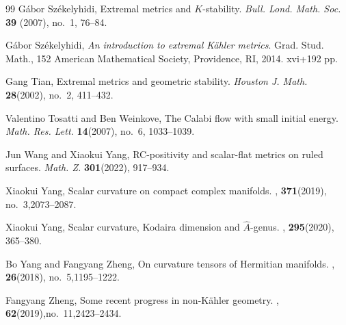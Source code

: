 \documentclass[12pt]{amsart}
\theoremstyle{plain}
\theoremstyle{definition}
\renewcommand{\hat}{\widehat}
\renewcommand{\>}{\rightarrow}
\renewcommand{\#}{\sharp}
\numberwithin{equation}{section} %
\begin{document}
\begin{thebibliography}{99}
    G\'abor  Sz\'ekelyhidi, Extremal metrics and $K$-stability.
    \emph{Bull. Lond. Math. Soc.}
    {\bf 39} (2007), no.~1, 76--84.

    G\'abor  Sz\'ekelyhidi,
    {\it An introduction to extremal K\"ahler metrics}.
     Grad. Stud. Math., 152 American Mathematical Society, Providence, RI, 2014. xvi+192 pp.

    Gang Tian,
    Extremal metrics and geometric stability.
    {\it Houston J. Math.}
    {\bf 28}(2002), no.~2, 411--432.


    Valentino Tosatti and Ben Weinkove,
    The Calabi flow with small initial energy.
    \emph{Math. Res. Lett.}
    \textbf{14}(2007), no.~6, 1033--1039.


    Jun Wang and Xiaokui Yang,
    RC-positivity and scalar-flat metrics on ruled surfaces.
    \emph{Math. Z.}
    \textbf{301}(2022), 917--934.






    Xiaokui Yang,
    \newblock Scalar curvature on compact complex manifolds.
    ,
    {\bf 371}(2019), no.~3,2073--2087.

    Xiaokui Yang,
    \newblock Scalar curvature, Kodaira dimension and $\hat {A}$-genus.
    ,
    {\bf 295}(2020), 365--380.




    Bo Yang and Fangyang Zheng,
    \newblock On curvature tensors of Hermitian manifolds.
    ,
    {\bf 26}(2018), no.~5,1195--1222.





    Fangyang Zheng,
    \newblock Some recent progress in non-{K}\"{a}hler geometry.
    ,
    {\bf 62}(2019),no.~11,2423--2434.


\end{thebibliography}


\end{document}
